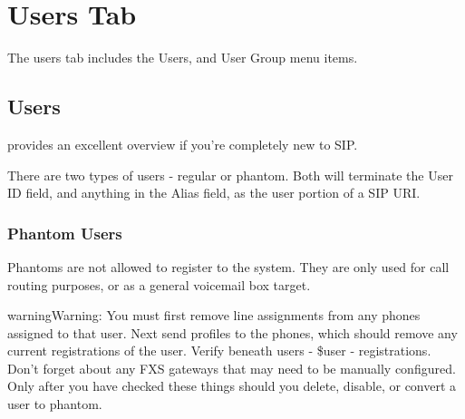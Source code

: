 \documentclass[letterpaper,10pt,english]{sphinxmanual}
\begin{document}
\section{Users Tab}
\label{\detokenize{webui:users-tab}}\label{\detokenize{webui:users}}\begin{quote}

\end{quote}

The users tab includes the Users, and User Group menu items.


\subsection{Users}
\label{\detokenize{webui:id1}}
 provides an excellent overview if you’re completely new to SIP.

There are two types of users - regular or phantom. Both will terminate the User ID field, and anything in the Alias field, as the user portion of a SIP URI.


\subsubsection{Phantom Users}
\label{\detokenize{webui:phantom-users}}
Phantoms are not allowed to register to the system. They are only used for call routing purposes, or as a general voicemail box target.
\begin{quote}

\end{quote}

\begin{sphinxadmonition}{warning}{Warning:}
You must first remove line assignments from any phones assigned to that user.
Next send profiles to the phones, which should remove any current registrations of the user. Verify beneath users - \$user - registrations.
Don’t forget about any FXS gateways that may need to be manually configured.
Only after you have checked these things should you delete, disable, or convert a user to phantom.
\end{sphinxadmonition}
\end{document}
